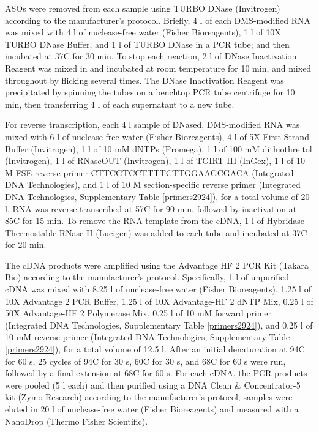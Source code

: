 \documentclass[main.tex]{subfiles}
\begin{document}
ASOs were removed from each sample using TURBO DNase (Invitrogen) according to the manufacturer's protocol.
Briefly, 4 \textmu l of each DMS-modified RNA was mixed with 4 \textmu l of nuclease-free water (Fisher Bioreagents), 1 \textmu l of 10X TURBO DNase Buffer, and 1 \textmu l of TURBO DNase in a PCR tube; and then incubated at 37\textdegree C for 30 min.
To stop each reaction, 2 \textmu l of DNase Inactivation Reagent was mixed in and incubated at room temperature for 10 min, and mixed throughout by flicking several times.
The DNase Inactivation Reagent was precipitated by spinning the tubes on a benchtop PCR tube centrifuge for 10 min, then transferring 4 \textmu l of each supernatant to a new tube.

For reverse transcription, each 4 \textmu l sample of DNased, DMS-modified RNA was mixed with 6 \textmu l of nuclease-free water (Fisher Bioreagents), 4 \textmu l of 5X First Strand Buffer (Invitrogen), 1 \textmu l of 10 mM dNTPs (Promega), 1 \textmu l of 100 mM dithiothreitol (Invitrogen), 1 \textmu l of RNaseOUT (Invitrogen), 1 \textmu l of TGIRT-III (InGex), 1 \textmu l of 10 \textmu M FSE reverse primer CTTCGTCCTTTTCTTGGAAGCGACA (Integrated DNA Technologies), and 1 \textmu l of 10 \textmu M section-specific reverse primer (Integrated DNA Technologies, Supplementary Table \ref{primers2924}), for a total volume of 20 \textmu l.
RNA was reverse transcribed at 57\textdegree C for 90 min, followed by inactivation at 85\textdegree C for 15 min.
To remove the RNA template from the cDNA, 1 \textmu l of Hybridase Thermostable RNase H (Lucigen) was added to each tube and incubated at 37\textdegree C for 20 min.

The cDNA products were amplified using the Advantage HF 2 PCR Kit (Takara Bio) according to the manufacturer's protocol.
Specifically, 1 \textmu l of unpurified cDNA was mixed with 8.25 \textmu l of nuclease-free water (Fisher Bioreagents), 1.25 \textmu l of 10X Advantage 2 PCR Buffer, 1.25 \textmu l of 10X Advantage-HF 2 dNTP Mix, 0.25 \textmu l of 50X Advantage-HF 2 Polymerase Mix, 0.25 \textmu l of 10 mM forward primer (Integrated DNA Technologies, Supplementary Table \ref{primers2924}), and 0.25 \textmu l of 10 mM reverse primer (Integrated DNA Technologies, Supplementary Table \ref{primers2924}), for a total volume of 12.5 \textmu l.
After an initial denaturation at 94\textdegree C for 60 s, 25 cycles of 94\textdegree C for 30 s, 60\textdegree C for 30 s, and 68\textdegree C for 60 s were run, followed by a final extension at 68\textdegree C for 60 s.
For each cDNA, the PCR products were pooled (5 \textmu l each) and then purified using a DNA Clean \& Concentrator-5 kit (Zymo Research) according to the manufacturer's protocol; samples were eluted in 20 \textmu l of nuclease-free water (Fisher Bioreagents) and measured with a NanoDrop (Thermo Fisher Scientific).
\end{document}
